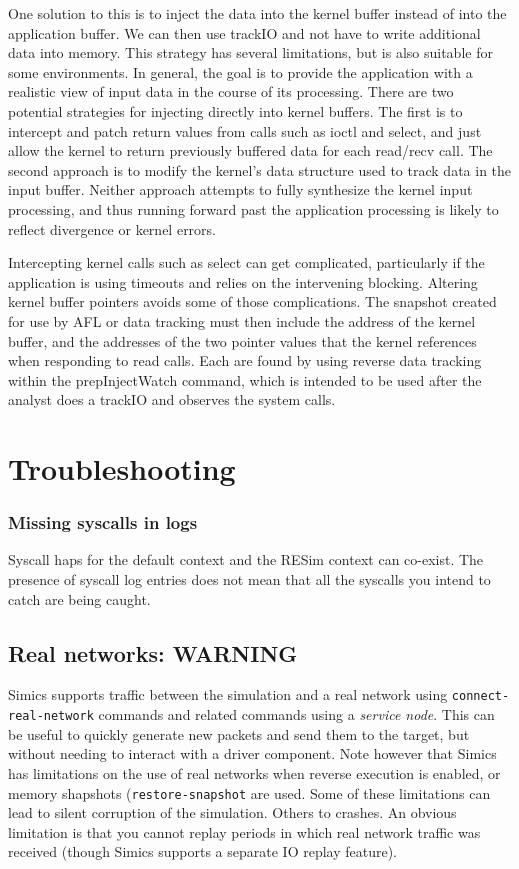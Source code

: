 \documentclass[titlepage]{article}
\begin{document}
\begin{appendices}
One solution to this is to inject the data into the kernel buffer instead of into the application buffer.
We can then use trackIO and not have to write additional data into memory.  This strategy has several limitations, but
is also suitable for some environments.  In general, the goal is to provide the application with a realistic view of
input data in the course of its processing.  There are two potential strategies for injecting directly into kernel buffers.
The first is to intercept and patch return values from calls such as ioctl and select, and just allow the kernel to 
return previously buffered data for each read/recv call.  The second approach is to modify the kernel's data structure
used to track data in the input buffer.  Neither approach attempts to fully synthesize the kernel input processing, and thus
running forward past the application processing is likely to reflect divergence or kernel errors.

Intercepting kernel calls such as select can get complicated, particularly if the application is using timeouts and relies
on the intervening blocking.  Altering kernel buffer pointers avoids some of those complications.  The snapshot created
for use by AFL or data tracking must then include the address of the kernel buffer, and the addresses of the two pointer
values that the kernel references when responding to read calls.  Each are found by using reverse data tracking within the
prepInjectWatch command, which is intended to be used after the analyst does a trackIO and observes the system calls.


\section{Troubleshooting}
\subsubsection{Missing syscalls in logs}
Syscall haps for the default context and the RESim context can co-exist.  The presence of syscall log entries does not
mean that all the syscalls you intend to catch are being caught.

\subsection{Real networks: WARNING}
\label{real-networks}
Simics supports traffic between the simulation and a real network using {\tt connect-real-network} commands and related commands using a \textit{service node}.
This can be useful to quickly generate new packets and send them to the target, but without needing to interact with a driver component.
Note however that Simics has limitations on the use of real networks when reverse execution is enabled, or memory shapshots ({\tt restore-snapshot} are used.  
Some of these limitations can lead to silent corruption
of the simulation.  Others to crashes.  An obvious limitation is that you cannot replay periods in which real network traffic was received (though Simics supports a separate IO replay feature).


\end{appendices}
\end{document}
